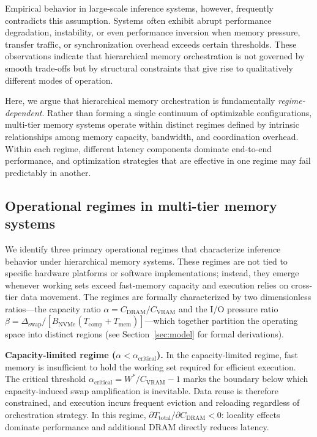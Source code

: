 Empirical behavior in large-scale inference systems, however, frequently contradicts this assumption. Systems often exhibit abrupt performance degradation, instability, or even performance inversion when memory pressure, transfer traffic, or synchronization overhead exceeds certain thresholds. These observations indicate that hierarchical memory orchestration is not governed by smooth trade-offs but by structural constraints that give rise to qualitatively different modes of operation.

Here, we argue that hierarchical memory orchestration is fundamentally \emph{regime-dependent}. Rather than forming a single continuum of optimizable configurations, multi-tier memory systems operate within distinct regimes defined by intrinsic relationships among memory capacity, bandwidth, and coordination overhead. Within each regime, different latency components dominate end-to-end performance, and optimization strategies that are effective in one regime may fail predictably in another.

\subsection{Operational regimes in multi-tier memory systems}
We identify three primary operational regimes that characterize inference behavior under hierarchical memory systems. These regimes are not tied to specific hardware platforms or software implementations; instead, they emerge whenever working sets exceed fast-memory capacity and execution relies on cross-tier data movement. The regimes are formally characterized by two dimensionless ratios---the capacity ratio $\alpha = C_{\mathrm{DRAM}}/C_{\mathrm{VRAM}}$ and the I/O pressure ratio $\beta = \Delta_{\mathrm{swap}} / [B_{\mathrm{NVMe}}(T_{\mathrm{comp}} + T_{\mathrm{mem}})]$---which together partition the operating space into distinct regions (see Section~\ref{sec:model} for formal derivations).

\textbf{Capacity-limited regime ($\alpha < \alpha_{\mathrm{critical}}$).} In the capacity-limited regime, fast memory is insufficient to hold the working set required for efficient execution. The critical threshold $\alpha_{\mathrm{critical}} = W^*/C_{\mathrm{VRAM}} - 1$ marks the boundary below which capacity-induced swap amplification is inevitable. Data reuse is therefore constrained, and execution incurs frequent eviction and reloading regardless of orchestration strategy. In this regime, $\partial T_{\mathrm{total}}/\partial C_{\mathrm{DRAM}} < 0$: locality effects dominate performance and additional DRAM directly reduces latency.

